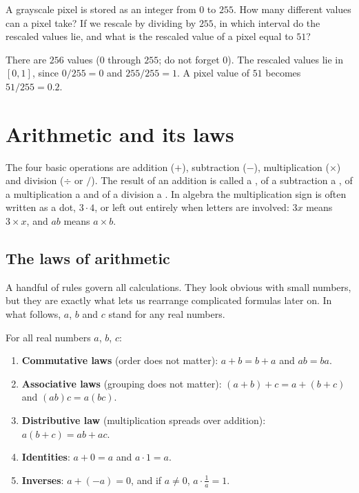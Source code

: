 \begin{exercise}
A grayscale pixel is stored as an integer from $0$ to $255$.
How many different values can a pixel take? If we rescale by dividing by
$255$, in which interval do the rescaled values lie, and what is the rescaled
value of a pixel equal to $51$?
\end{exercise}
\begin{solution}
There are $256$ values ($0$ through $255$; do not forget $0$). The rescaled
values lie in $[0,1]$, since $0/255 = 0$ and $255/255 = 1$. A pixel value of
$51$ becomes $51/255 = 0.2$.
\end{solution}

\section{Arithmetic and its laws}\label{sec:arithmetic}

The four basic operations are addition ($+$), subtraction ($-$),
multiplication ($\times$) and division ($\div$ or $/$). The result of an
addition is called a , of a subtraction a , of a
multiplication a  and of a division a . In
algebra the multiplication sign is often written as a dot, $3 \cdot 4$, or
left out entirely when letters are involved: $3x$ means $3 \times x$, and $ab$
means $a \times b$.

\subsection{The laws of arithmetic}

A handful of rules govern all calculations. They look obvious with small
numbers, but they are exactly what lets us rearrange complicated formulas
later on. In what follows, $a$, $b$ and $c$ stand for any real numbers.

\begin{theorem}\label{thm:laws-arithmetic}
For all real numbers $a$, $b$, $c$:
\begin{enumerate}
  \item \textbf{Commutative laws} (order does not matter):
    $a + b = b + a$ and $ab = ba$.
  \item \textbf{Associative laws} (grouping does not matter):
    $(a+b)+c = a+(b+c)$ and $(ab)c = a(bc)$.
  \item \textbf{Distributive law} (multiplication spreads over addition):
    $a(b+c) = ab + ac$.
  \item \textbf{Identities}: $a + 0 = a$ and $a \cdot 1 = a$.
  \item \textbf{Inverses}: $a + (-a) = 0$, and if $a \neq 0$,
    $a \cdot \tfrac{1}{a} = 1$.
\end{enumerate}
\end{theorem}

